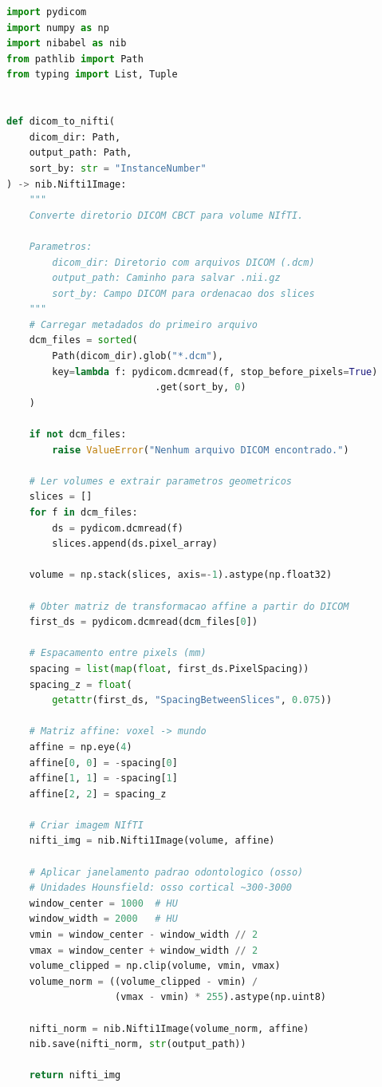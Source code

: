 \begin{lstlisting}[language=Python, caption=Pipeline de conversao DICOM$\rightarrow$NIfTI com pydicom e nibabel, label=code:dicom-nifti]
import pydicom
import numpy as np
import nibabel as nib
from pathlib import Path
from typing import List, Tuple


def dicom_to_nifti(
    dicom_dir: Path,
    output_path: Path,
    sort_by: str = "InstanceNumber"
) -> nib.Nifti1Image:
    """
    Converte diretorio DICOM CBCT para volume NIfTI.

    Parametros:
        dicom_dir: Diretorio com arquivos DICOM (.dcm)
        output_path: Caminho para salvar .nii.gz
        sort_by: Campo DICOM para ordenacao dos slices
    """
    # Carregar metadados do primeiro arquivo
    dcm_files = sorted(
        Path(dicom_dir).glob("*.dcm"),
        key=lambda f: pydicom.dcmread(f, stop_before_pixels=True)
                          .get(sort_by, 0)
    )

    if not dcm_files:
        raise ValueError("Nenhum arquivo DICOM encontrado.")

    # Ler volumes e extrair parametros geometricos
    slices = []
    for f in dcm_files:
        ds = pydicom.dcmread(f)
        slices.append(ds.pixel_array)

    volume = np.stack(slices, axis=-1).astype(np.float32)

    # Obter matriz de transformacao affine a partir do DICOM
    first_ds = pydicom.dcmread(dcm_files[0])

    # Espacamento entre pixels (mm)
    spacing = list(map(float, first_ds.PixelSpacing))
    spacing_z = float(
        getattr(first_ds, "SpacingBetweenSlices", 0.075))

    # Matriz affine: voxel -> mundo
    affine = np.eye(4)
    affine[0, 0] = -spacing[0]
    affine[1, 1] = -spacing[1]
    affine[2, 2] = spacing_z

    # Criar imagem NIfTI
    nifti_img = nib.Nifti1Image(volume, affine)

    # Aplicar janelamento padrao odontologico (osso)
    # Unidades Hounsfield: osso cortical ~300-3000
    window_center = 1000  # HU
    window_width = 2000   # HU
    vmin = window_center - window_width // 2
    vmax = window_center + window_width // 2
    volume_clipped = np.clip(volume, vmin, vmax)
    volume_norm = ((volume_clipped - vmin) /
                   (vmax - vmin) * 255).astype(np.uint8)

    nifti_norm = nib.Nifti1Image(volume_norm, affine)
    nib.save(nifti_norm, str(output_path))

    return nifti_img
\end{lstlisting}

